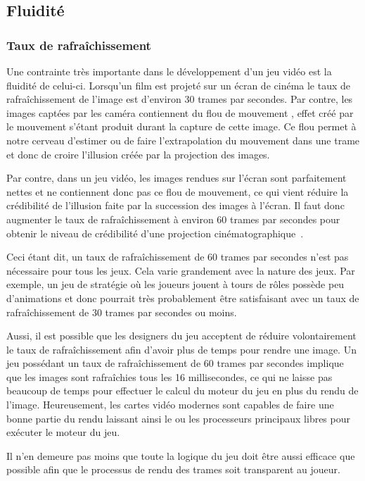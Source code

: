 \documentclass[12pt,oneside,letterpaper,francais]{book}
\begin{document}
\subsection{Fluidité}


\subsubsection{Taux de rafraîchissement}
Une contrainte très importante dans le développement d'un jeu vidéo
est la fluidité de celui-ci. Lorsqu'un film est projeté sur un écran
de cinéma le taux de rafraîchissement de l'image est d'environ 30
trames par secondes. Par contre, les images captées par les caméra
contiennent du \og flou de mouvement \fg, effet créé par le mouvement
s'étant produit durant la capture de cette image. Ce flou permet à
notre cerveau d'estimer ou de faire l'extrapolation du mouvement dans
une trame et donc de croire l'illusion créée par la projection des
images.

Par contre, dans un jeu vidéo, les images rendues sur l'écran sont
parfaitement nettes et ne contiennent donc pas ce flou de mouvement,
ce qui vient réduire la crédibilité de l'illusion faite par la
succession des images à l'écran. Il faut donc augmenter le taux de
rafraîchissement à environ 60 trames par secondes pour obtenir le
niveau de crédibilité d'une projection
cinématographique~\cite{30vs60}.

Ceci étant dit, un taux de rafraîchissement de 60 trames par secondes
n'est pas nécessaire pour tous les jeux. Cela varie grandement avec la
nature des jeux. Par exemple, un jeu de stratégie où les joueurs
jouent à tours de rôles possède peu d'animations et donc pourrait très
probablement être satisfaisant avec un taux de rafraîchissement de 30
trames par secondes ou moins.

Aussi, il est possible que les designers du jeu acceptent de réduire
volontairement le taux de rafraîchissement afin d'avoir plus de temps
pour rendre une image. Un jeu possédant un taux de rafraîchissement de
60 trames par secondes implique que les images sont rafraîchies tous
les 16 millisecondes, ce qui ne laisse pas beaucoup de temps pour
effectuer le calcul du moteur du jeu en plus du rendu de
l'image. Heureusement, les cartes vidéo modernes sont capables de
faire une bonne partie du rendu laissant ainsi le ou les processeurs
principaux libres pour exécuter le moteur du jeu.

Il n'en demeure pas moins que toute la logique du jeu doit être aussi
efficace que possible afin que le processus de rendu des trames soit
transparent au joueur.
\end{document}

